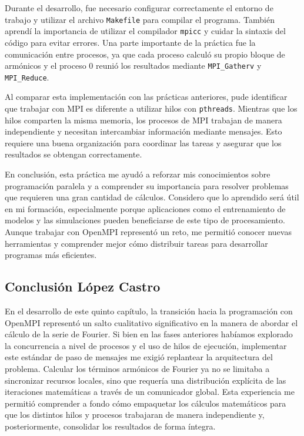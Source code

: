 Durante el desarrollo, fue necesario configurar correctamente el entorno de trabajo y utilizar el archivo \texttt{Makefile} para compilar el programa. También aprendí la importancia de utilizar el compilador \texttt{mpicc} y cuidar la sintaxis del código para evitar errores. Una parte importante de la práctica fue la comunicación entre procesos, ya que cada proceso calculó su propio bloque de armónicos y el proceso $0$ reunió los resultados mediante \texttt{MPI\_Gatherv} y \texttt{MPI\_Reduce}.

Al comparar esta implementación con las prácticas anteriores, pude identificar que trabajar con MPI es diferente a utilizar hilos con \texttt{pthreads}. Mientras que los hilos comparten la misma memoria, los procesos de MPI trabajan de manera independiente y necesitan intercambiar información mediante mensajes. Esto requiere una buena organización para coordinar las tareas y asegurar que los resultados se obtengan correctamente.

En conclusión, esta práctica me ayudó a reforzar mis conocimientos sobre programación paralela y a comprender su importancia para resolver problemas que requieren una gran cantidad de cálculos. Considero que lo aprendido será útil en mi formación, especialmente porque aplicaciones como el entrenamiento de modelos y las simulaciones pueden beneficiarse de este tipo de procesamiento. Aunque trabajar con OpenMPI representó un reto, me permitió conocer nuevas herramientas y comprender mejor cómo distribuir tareas para desarrollar programas más eficientes.

\clearpage
\subsection*{Conclusión López Castro}
En el desarrollo de este quinto capítulo, la transición hacia la programación con OpenMPI representó un salto cualitativo significativo en la manera de abordar el cálculo de la serie de Fourier. Si bien en las fases anteriores habíamos explorado la concurrencia a nivel de procesos y el uso de hilos de ejecución, implementar este estándar de paso de mensajes me exigió replantear la arquitectura del problema. Calcular los términos armónicos de Fourier ya no se limitaba a sincronizar recursos locales, sino que requería una distribución explícita de las iteraciones matemáticas a través de un comunicador global. Esta experiencia me permitió comprender a fondo cómo empaquetar los cálculos matemáticos para que los distintos hilos y procesos trabajaran de manera independiente y, posteriormente, consolidar los resultados de forma íntegra.

